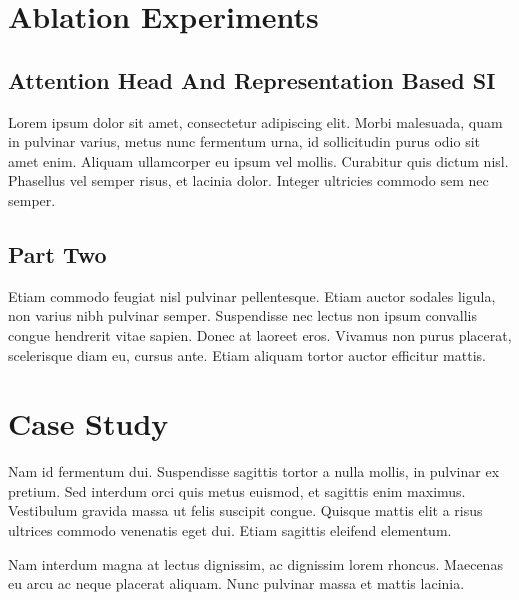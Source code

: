 \documentclass[manuscript,screen]{acmart}
\begin{document}



\appendix

\section{Ablation Experiments}

\subsection{Attention Head And Representation Based SI}

Lorem ipsum dolor sit amet, consectetur adipiscing elit. Morbi
malesuada, quam in pulvinar varius, metus nunc fermentum urna, id
sollicitudin purus odio sit amet enim. Aliquam ullamcorper eu ipsum
vel mollis. Curabitur quis dictum nisl. Phasellus vel semper risus, et
lacinia dolor. Integer ultricies commodo sem nec semper.

\subsection{Part Two}

Etiam commodo feugiat nisl pulvinar pellentesque. Etiam auctor sodales
ligula, non varius nibh pulvinar semper. Suspendisse nec lectus non
ipsum convallis congue hendrerit vitae sapien. Donec at laoreet
eros. Vivamus non purus placerat, scelerisque diam eu, cursus
ante. Etiam aliquam tortor auctor efficitur mattis.

\section{Case Study}

Nam id fermentum dui. Suspendisse sagittis tortor a nulla mollis, in
pulvinar ex pretium. Sed interdum orci quis metus euismod, et sagittis
enim maximus. Vestibulum gravida massa ut felis suscipit
congue. Quisque mattis elit a risus ultrices commodo venenatis eget
dui. Etiam sagittis eleifend elementum.

Nam interdum magna at lectus dignissim, ac dignissim lorem
rhoncus. Maecenas eu arcu ac neque placerat aliquam. Nunc pulvinar
massa et mattis lacinia.
\end{document}
